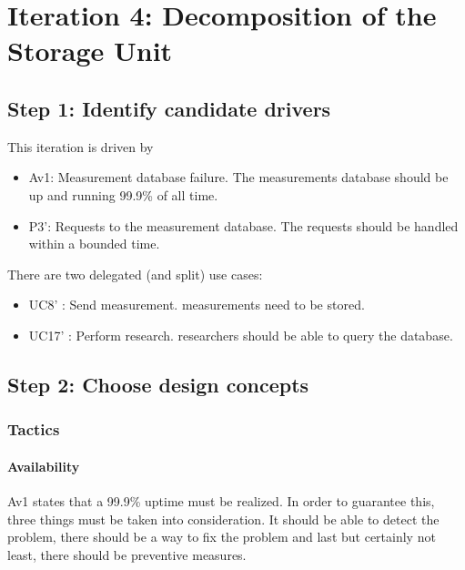 \section{Iteration 4: Decomposition of the Storage Unit}
\label{add:it4}

\subsection{Step 1: Identify candidate drivers}
\label{add:it4/drivers}

\npar This iteration is driven by

\begin{itemize}
	\item Av1: Measurement database failure. The measurements database should be up
	and running 99.9\% of all time. 
  	\item P3': Requests to the measurement database. The requests should be
  	handled within a bounded time. 
\end{itemize}

\npar There are two delegated (and split) use cases:

\begin{itemize}
  	\item UC8' : Send measurement. measurements need to be stored.
  	\item UC17' : Perform research. researchers should be able to query the
  	database.
\end{itemize}

\subsection{Step 2: Choose design concepts}
\label{add:it4/concepts}

\subsubsection{Tactics}
\label{add:it4/tactics}

\paragraph{Availability} 

\npar Av1 states that a 99.9\% uptime must be realized. In order to guarantee
this, three things must be taken into consideration. It should be able to detect
the problem, there should be a way to fix the problem and last but certainly not
least, there should be preventive measures.


